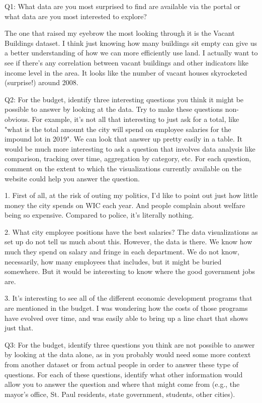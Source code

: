 Q1: What data are you most surprised to find are available via the portal or what data are you most interested to explore?

The one that raised my eyebrow the most looking through it is the Vacant Buildings dataset. I think just knowing how many buildings sit empty can give us a better understanding of how we can more efficiently use land. I actually want to see if there's any correlation between vacant buildings and other indicators like income level in the area. It looks like the number of vacant houses skyrocketed (surprise!) around 2008.

Q2: For the budget, identify three interesting questions you think it might be possible to answer by looking at the data.  Try to make these questions non-obvious.  For example, it's not all that interesting to just ask for a total, like "what is the total amount the city will spend on employee salaries for the impound lot in 2019".  We can look that answer up pretty easily in a table.  It would be much more interesting to ask a question that involves data analysis like comparison, tracking over time, aggregation by category, etc.  For each question, comment on the extent to which the visualizations currently available on the website could help you answer the question.

1. First of all, at the risk of outing my politics, I'd like to point out just how little money the city spends on WIC each year. And people complain about welfare being so expensive. Compared to police, it's literally nothing.

2. What city employee positions have the best salaries? The data visualizations as set up do not tell us much about this. However, the data is there. We know how much they spend on salary and fringe in each department. We do not know, necessarily, how many employees that includes, but it might be buried somewhere. But it would be interesting to know where the good government jobs are.

3. It's interesting to see all of the different economic development programs that are mentioned in the budget. I was wondering how the costs of those programs have evolved over time, and was easily able to bring up a line chart that shows just that.

Q3: For the budget, identify three questions you think are not possible to answer by looking at the data alone, as in you probably would need some more context from another dataset or from actual people in order to answer these type of questions.  For each of these questions, identify what other information would allow you to answer the question and where that might come from (e.g., the mayor's office, St. Paul residents, state government, students, other cities).


